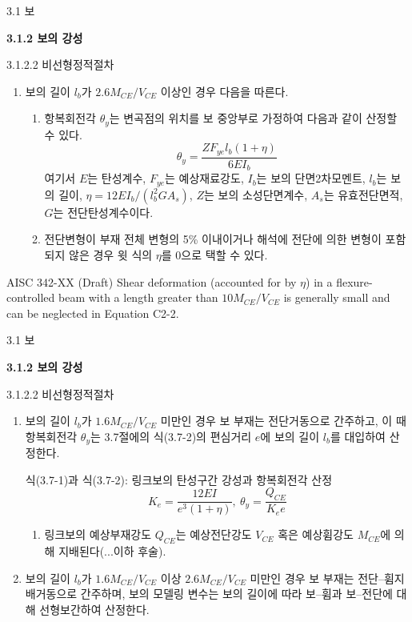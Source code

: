 \begin{frame}{3.1 보}

	\textbf{3.1.2 보의 강성}

3.1.2.2 비선형정적절차

\begin{enumerate}
	\item[(3)] 보의 길이 $l_b$가 $2.6M_{CE}/V_{CE}$ 이상인 경우 다음을 따른다. 
	\begin{enumerate}[label=\large\protect\textcircled{\small\arabic*}]
		\item 항복회전각 $\theta_y$는 변곡점의 위치를 보 중앙부로 가정하여 다음과 같이 산정할 수 있다. 
		\[\theta_y = \frac{ZF_{ye}l_b(1+\eta)}{6EI_b}\]
		\noindent 여기서 $E$는 탄성계수, $F_{ye}$는 예상재료강도, $I_b$는 보의 단면2차모멘트, $l_b$는 보의 길이, $\eta=12EI_b/(l_b^2GA_s)$, $Z$는 보의 소성단면계수, $A_s$는 유효전단면적, $G$는 전단탄성계수이다. 
		\item 전단변형이 부재 전체 변형의 5\% 이내이거나 해석에 전단에 의한 변형이 포함되지 않은 경우 윗 식의 $\eta$를 0으로 택할 수 있다. 
	\end{enumerate}
\end{enumerate}

	\begin{block}{AISC 342-XX (Draft)}
	Shear deformation (accounted for by $\eta$) in a flexure-controlled beam with a length greater than $10M_{CE}/V_{CE}$ is generally small and can be neglected in Equation C2-2.
\end{block}	

\end{frame}


\begin{frame}{3.1 보}

	\textbf{3.1.2 보의 강성}

3.1.2.2 비선형정적절차

\begin{enumerate}
	\item[(4)] 보의 길이 $l_b$가 $1.6M_{CE}/V_{CE}$ 미만인 경우 보 부재는 전단거동으로 간주하고, 이 때 항복회전각 $\theta_y$는 3.7절에의 식(3.7-2)의 편심거리 $e$에 보의 길이 $l_b$를 대입하여 산정한다. 
\begin{block}{식(3.7-1)과 식(3.7-2): 링크보의 탄성구간 강성과 항복회전각 산정}
	\[K_e = \frac{12EI}{e^3(1 + \eta)},~\theta_y = \frac{Q_{CE}}{K_ee}\]
	\begin{enumerate}
	\item[(1)] 링크보의 예상부재강도 $Q_{CE}$는 예상전단강도 $V_{CE}$ 혹은 예상휨강도 $M_{CE}$에 의해 지배된다(...이하 후술).
	\end{enumerate}
\end{block}	
	\item[(5)] 보의 길이 $l_b$가 $1.6M_{CE}/V_{CE}$ 이상 $2.6M_{CE}/V_{CE}$ 미만인 경우 보 부재는 전단--휨지배거동으로 간주하며, 보의 모델링 변수는 보의 길이에 따라 보--휨과 보--전단에 대해 선형보간하여 산정한다. 
\end{enumerate}
\end{frame}

